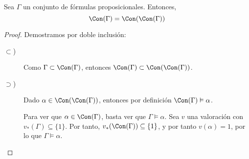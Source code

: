 \begin{prop}
    Sea $\Gamma$ un conjunto de fórmulas proposicionales. Entonces,
    \begin{equation*}
        \Con(\Gamma)=\Con(\Con(\Gamma))
    \end{equation*}
    \begin{proof}
        Demostramos por doble inclusión:
        \begin{description}
            \item[$\subset$)] Como $\Gamma\subset \Con(\Gamma)$, entonces $\Con(\Gamma)\subset \Con(\Con(\Gamma))$.
            
            \item[$\supset$)] Dado $\alpha\in \Con(\Con(\Gamma))$, entonces por definición $\Con(\Gamma)\vDash\alpha$.
            
            Para ver que $\alpha\in \Con(\Gamma)$, basta ver que $\Gamma\vDash\alpha$. Sea $v$ una valoración con $v_\ast(\Gamma)\subseteq \{1\}$.
            Por tanto, $v_\ast(\Con(\Gamma))\subseteq \{1\}$, y por tanto $v(\alpha)=1$, por lo que $\Gamma\vDash\alpha$.
        \end{description}
    \end{proof}
\end{prop}


